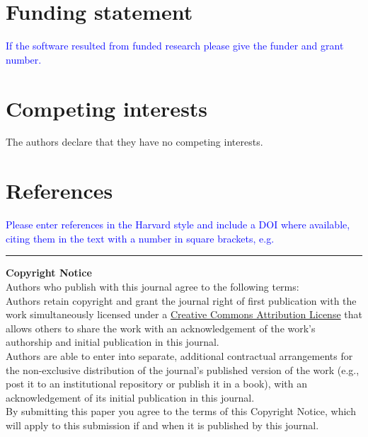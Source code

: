 \documentclass{jors}
\begin{document}
\section*{Funding statement}

\textcolor{blue}{If the software resulted from funded research please give the funder and grant number.}

\section*{Competing interests}
The authors declare that they have no competing interests.

\section*{References}

\textcolor{blue}{Please enter references in the Harvard style and include a DOI where available, citing them in the text with a number in square brackets, e.g. \\ }

\printbibliography

\vspace{2cm}

\rule{\textwidth}{1pt}

{ \bf Copyright Notice} \\
Authors who publish with this journal agree to the following terms: \\

Authors retain copyright and grant the journal right of first publication with the work simultaneously licensed under a  \href{http://creativecommons.org/licenses/by/3.0/}{Creative Commons Attribution License} that allows others to share the work with an acknowledgement of the work's authorship and initial publication in this journal. \\

Authors are able to enter into separate, additional contractual arrangements for the non-exclusive distribution of the journal's published version of the work (e.g., post it to an institutional repository or publish it in a book), with an acknowledgement of its initial publication in this journal. \\

By submitting this paper you agree to the terms of this Copyright Notice, which will apply to this submission if and when it is published by this journal.
\end{document}
